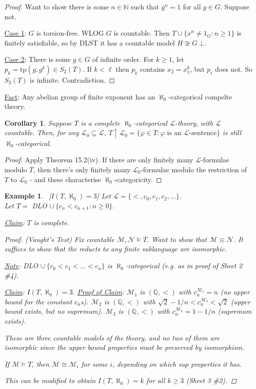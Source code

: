 \documentclass[]{article}
\theoremstyle{custhm}
\theoremstyle{cusdef}
\theoremstyle{custhm}
\theoremstyle{custhm}
\newtheorem{cor}[theorem]{Corollary}
\theoremstyle{custhm}
\theoremstyle{ex}
\newtheorem{ex}[theorem]{Example}
\theoremstyle{custhm}
\theoremstyle{cusdef}
\theoremstyle{remark}
\theoremstyle{remark}
\theoremstyle{numremark}
\newcommand{\Q}{\mathbb{Q}}
\renewcommand{\L}{\mathcal{L}}
\renewcommand{\it}[1]{\textit{#1}}
\newcommand{\M}{\mathcal{M}}
\renewcommand{\phi}{\varphi}
\newcommand{\tp}{\textrm{tp}}
\newcommand{\false}{\bot}
\newcommand{\N}{\mathcal{N}}
\renewcommand{\subset}{\subseteq}
\begin{document}
\begin{proof}
	Want to show there is some $n\in \mathbb{N}$ such that $g^n = 1$ for all $g\in G$. Suppose not.

	\underline{Case 1}: $G$ is torsion-free. WLOG $G$ is countable. Then $T\cup \{x^n\ne 1_G : n\ge 1\}$ is finitely satisfiable, so by DLST it has a countable model $H\not\cong G\ \false$.

	\underline{Case 2}: There is some $g \in G$ of infinite order. For $k \ge 1$, let $p_k = \tp(g,g^k)\in S_2(T)$. If $k < \ell$ then $p_k$ contains $x_2 = x_1^k$, but $p_\ell$ does not. So $S_2(T)$ is infinite. Contradiction.
\end{proof}

\underline{Fact}: Any abelian group of finite exponent has an $\aleph_0$-categorical compelte theory.

\begin{cor}
	Suppose $T$ is a complete $\aleph_0$-categorical $\L$-theory, with $\L$ countable. Then, for any $\L_0 \subset \L$, $T\upharpoonright \L_0 = \{\phi\in T:\phi \textrm{ is an }\L\textrm{-sentence}\}$ is still $\aleph_0$-categorical.
\end{cor}
\begin{proof}
	Apply Theorem 15.2(iv). If there are only finitely many $\L$-formulae modulo $T$, then there's only finitely many $\L_0$-formulae modulo the restriction of $T$ to $\L_0$ - and these characterise $\aleph_0$-categoricity.
\end{proof}
\begin{ex}\ [$I(T,\aleph_0) = 3$] Let $\L = \{<,c_0,c_1,c_2,\dots\}$.\ \\
	Let $T = $ DLO $\cup\ \{c_n<c_{n+1}:n\ge0\}$.

	\underline{Claim}: $T$ is complete.
	\begin{proof}(Vaught's Test)
		Fix countable $\M,\N\models T$. Want to show that $\M\equiv \N$. It suffices to show that the reducts to any finite sublanguage are isomorphic.
		
		\underline{Note}: DLO $\cup\ \{c_0 < c_1<\dots < c_n\}$ is $\aleph_0$-categorical (\it{e.g.} as in proof of Sheet 2 \#4).

		\underline{Claim}: $I(T,\aleph_0) = 3$.
		\underline{Proof of Claim}: $\M_1$ is $(\Q,<)$ with $c_n^{\M_1} = n$ (no upper bound for the constant $c_n$s). $\M_2$ is $(\Q,<)$ with $\sqrt{2} - 1/n < c_n^{\M_2} < \sqrt{2}$ (upper bound exists, but no supremum).
		$\M_3$ is $(\Q,<)$ with $c_n^{\M_3} = 1 - 1/n$ (supremum exists).

		These are three countable models of the theory, and no two of them are isomorphic since the upper bound properties must be preserved by isomorphism.

		If $\M\models T$, then $\M\cong \M_i$ for some $i$, depending on which sup properties it has.

		This can be modified to obtain $I(T,\aleph_0) = k$ for all $k\ge 3$ (Sheet 3 \#2).
	\end{proof}
\end{ex}
\end{document}
